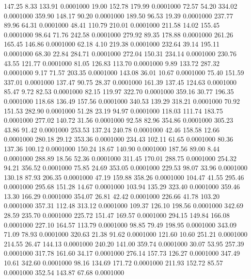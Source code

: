  147.25    8.33  133.91   0.0001000
  19.00  152.78  179.99   0.0001000
  72.57   54.20  334.02   0.0001000
 359.90  148.17   90.20   0.0001000
 189.50   96.53   19.39   0.0001000
 237.77   89.96   64.31   0.0001000
  48.41  110.79  210.01   0.0001000
 211.58   14.02  155.45   0.0001000
  98.64   71.76  242.58   0.0001000
 279.92   89.35  178.88   0.0001000
 261.26  165.45  146.86   0.0001000
  62.18    4.10  219.38   0.0001000
 232.64   39.14  195.11   0.0001000
  68.30   22.84  284.71   0.0001000
 272.04  150.31  234.14   0.0001000
 230.76   43.55  121.77   0.0001000
  81.05  126.83  113.70   0.0001000
   9.89  133.72  287.32   0.0001000
   9.17   71.57  203.35   0.0001000
 143.08   36.01   10.67   0.0001000
  75.40  151.59  337.01   0.0001000
 137.47   90.75   28.37   0.0001000
 161.39  137.45  124.63   0.0001000
  85.47    9.72   82.53   0.0001000
  82.15  119.97  322.70   0.0001000
 359.16   30.77  196.35   0.0001000
 118.68  136.49  157.56   0.0001000
 340.53  139.29  318.21   0.0001000
  70.92  151.53  282.90   0.0001000
  51.28   23.19   94.97   0.0001000
 118.03  111.74  183.75   0.0001000
 277.02  140.72   31.56   0.0001000
  92.58   82.96  354.86   0.0001000
 305.23   43.86   91.42   0.0001000
 253.53  137.24  240.78   0.0001000
  42.46  158.58   12.66   0.0001000
 280.18   29.12  353.36   0.0001000
 234.43  102.11   61.65   0.0001000
  80.36  137.36  100.12   0.0001000
 150.24   18.67  140.90   0.0001000
 187.56   89.00    8.44   0.0001000
 288.89   18.56   52.36   0.0001000
 311.45  170.01  288.75   0.0001000
 254.32   94.21  356.52   0.0001000
  75.85   24.69  353.05   0.0001000
 229.53   98.07   33.96   0.0001000
 130.18   87.93  206.35   0.0001000
  47.19  159.88  358.26   0.0001000
 104.47   41.55  295.46   0.0001000
 295.68  151.28   14.67   0.0001000
 103.94  135.29  323.40   0.0001000
 359.46   13.30  166.29   0.0001000
 354.07   26.81   42.42   0.0001000
 226.66   41.78  103.20   0.0001000
 357.31  112.48  313.12   0.0001000
 109.37  126.10  198.56   0.0001000
 342.69   28.59  235.70   0.0001000
 225.72  151.47  169.57   0.0001000
 294.15  149.84  166.08   0.0001000
 227.10  164.57  113.79   0.0001000
  98.85   79.49  198.95   0.0001000
 343.09   71.09   78.93   0.0001000
 320.63   21.38   91.62   0.0001000
 121.60   10.60  251.21   0.0001000
 214.55   26.47  144.13   0.0001000
 240.20  141.00  359.74   0.0001000
  30.07   53.95  257.39   0.0001000
 317.78  161.60   34.17   0.0001000
 276.14  157.73  126.27   0.0001000
 347.49   10.61  342.60   0.0001000
  98.16  134.69  171.72   0.0001000
 211.93  152.72   85.57   0.0001000
 352.54  143.87   67.68   0.0001000
